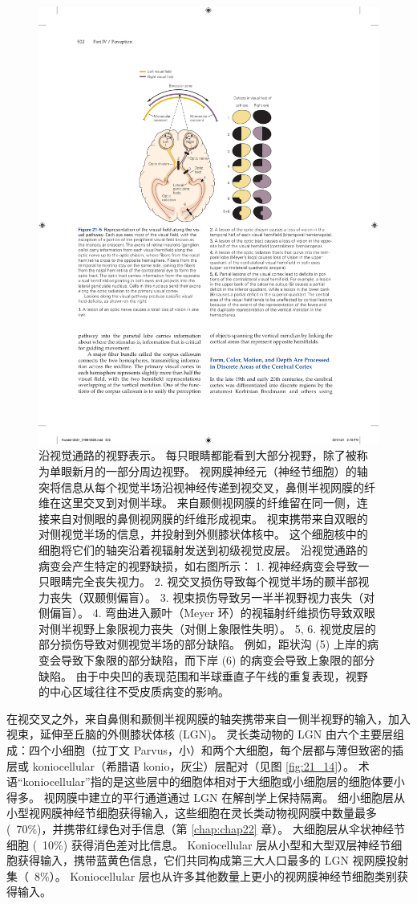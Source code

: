 \begin{figure}[htbp]
	\centering
	\includegraphics[width=0.6\linewidth]{chap21/fig_21_5}
	\caption{沿视觉通路的视野表示。 
		每只眼睛都能看到大部分视野，除了被称为单眼新月的一部分周边视野。 
		视网膜神经元（神经节细胞）的轴突将信息从每个视觉半场沿视神经传递到视交叉，鼻侧半视网膜的纤维在这里交叉到对侧半球。 
		来自颞侧视网膜的纤维留在同一侧，连接来自对侧眼的鼻侧视网膜的纤维形成视束。 
		视束携带来自双眼的对侧视觉半场的信息，并投射到外侧膝状体核中。 
		这个细胞核中的细胞将它们的轴突沿着视辐射发送到初级视觉皮层。 
		沿视觉通路的病变会产生特定的视野缺损，如右图所示： 
		1. 视神经病变会导致一只眼睛完全丧失视力。 
		2. 视交叉损伤导致每个视觉半场的颞半部视力丧失（双颞侧偏盲）。 
		3. 视束损伤导致另一半半视野视力丧失（对侧偏盲）。 
		4. 弯曲进入颞叶（Meyer 环）的视辐射纤维损伤导致双眼对侧半视野上象限视力丧失（对侧上象限性失明）。 5, 6. 视觉皮层的部分损伤导致对侧视觉半场的部分缺陷。 例如，距状沟 (5) 上岸的病变会导致下象限的部分缺陷，而下岸 (6) 的病变会导致上象限的部分缺陷。 由于中央凹的表现范围和半球垂直子午线的重复表现，视野的中心区域往往不受皮质病变的影响。}
	\label{fig:21_5}
\end{figure}


在视交叉之外，来自鼻侧和颞侧半视网膜的轴突携带来自一侧半视野的输入，加入视束，延伸至丘脑的外侧膝状体核 (LGN)。 
灵长类动物的 LGN 由六个主要层组成：四个小细胞（拉丁文 Parvus，小）和两个大细胞，每个层都与薄但致密的插层或 koniocellular（希腊语 konio，灰尘）层配对（见图 \ref{fig:21_14}）。 
术语“koniocellular”指的是这些层中的细胞体相对于大细胞或小细胞层的细胞体要小得多。 
视网膜中建立的平行通道通过 LGN 在解剖学上保持隔离。 
细小细胞层从小型视网膜神经节细胞获得输入，这些细胞在灵长类动物视网膜中数量最多 (~70\%)，并携带红绿色对手信息（第 \ref{chap:chap22} 章）。 
大细胞层从伞状神经节细胞 (~10\%) 获得消色差对比信息。 
Koniocellular 层从小型和大型双层神经节细胞获得输入，携带蓝黄色信息，它们共同构成第三大人口最多的 LGN 视网膜投射集（~8\%）。 
Koniocellular 层也从许多其他数量上更小的视网膜神经节细胞类别获得输入。


